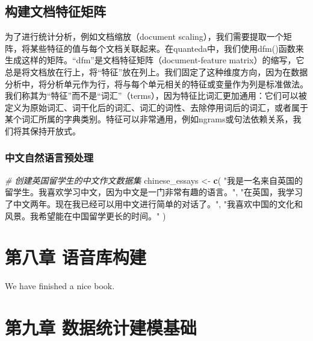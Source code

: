 \documentclass[]{book}
\newenvironment{Shaded}{\begin{snugshade}}{\end{snugshade}}
\newcommand{\CommentTok}[1]{\textcolor[rgb]{0.56,0.35,0.01}{\textit{#1}}}
\newcommand{\KeywordTok}[1]{\textcolor[rgb]{0.13,0.29,0.53}{\textbf{#1}}}
\newcommand{\NormalTok}[1]{#1}
\newcommand{\StringTok}[1]{\textcolor[rgb]{0.31,0.60,0.02}{#1}}
\begin{document}
\hypertarget{ux6784ux5efaux6587ux6863ux7279ux5f81ux77e9ux9635}{%
\section{构建文档特征矩阵}\label{ux6784ux5efaux6587ux6863ux7279ux5f81ux77e9ux9635}}

为了进行统计分析，例如文档缩放（document scaling），我们需要提取一个矩阵，将某些特征的值与每个文档关联起来。在quanteda中，我们使用dfm()函数来生成这样的矩阵。``dfm''是文档特征矩阵（document-feature matrix）的缩写，它总是将文档放在行上，将``特征''放在列上。我们固定了这种维度方向，因为在数据分析中，将分析单元作为行，将与每个单元相关的特征或变量作为列是标准做法。我们称其为``特征''而不是``词汇''（terms），因为特征比词汇更加通用：它们可以被定义为原始词汇、词干化后的词汇、词汇的词性、去除停用词后的词汇，或者属于某个词汇所属的字典类别。特征可以非常通用，例如ngrams或句法依赖关系，我们将其保持开放式。

\hypertarget{ux4e2dux6587ux81eaux7136ux8bedux8a00ux9884ux5904ux7406}{%
\subsection{中文自然语言预处理}\label{ux4e2dux6587ux81eaux7136ux8bedux8a00ux9884ux5904ux7406}}

\begin{Shaded}
\begin{Highlighting}[]
\CommentTok{# 创建英国留学生的中文作文数据集}
\NormalTok{chinese_essays <-}\StringTok{ }\KeywordTok{c}\NormalTok{(}
  \StringTok{"我是一名来自英国的留学生。我喜欢学习中文，因为中文是一门非常有趣的语言。"}\NormalTok{,}
  \StringTok{"在英国，我学习了中文两年。现在我已经可以用中文进行简单的对话了。"}\NormalTok{,}
  \StringTok{"我喜欢中国的文化和风景。我希望能在中国留学更长的时间。"}
\NormalTok{)}
\end{Highlighting}
\end{Shaded}

\hypertarget{ux7b2cux516bux7ae0-ux8bedux97f3ux5e93ux6784ux5efa}{%
\chapter{第八章 语音库构建}\label{ux7b2cux516bux7ae0-ux8bedux97f3ux5e93ux6784ux5efa}}

We have finished a nice book.

\hypertarget{ux7b2cux4e5dux7ae0-ux6570ux636eux7edfux8ba1ux5efaux6a21ux57faux7840}{%
\chapter{第九章 数据统计建模基础}\label{ux7b2cux4e5dux7ae0-ux6570ux636eux7edfux8ba1ux5efaux6a21ux57faux7840}}
\end{document}
